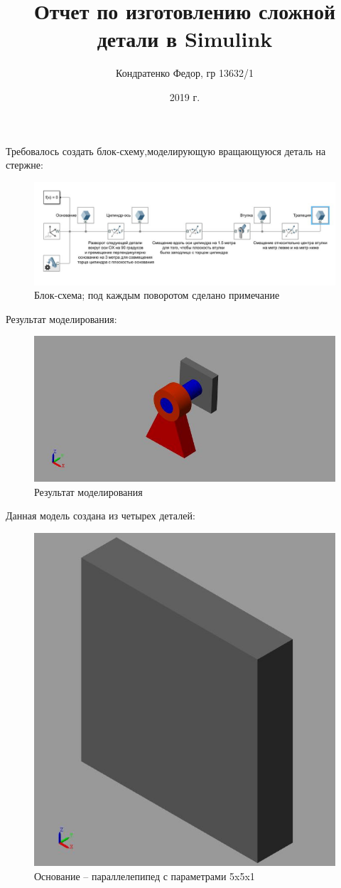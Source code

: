 \documentclass{article}
\date{2019 г.}
\author{Кондратенко Федор, гр 13632/1}
\title{Отчет по изготовлению сложной детали в Simulink}
\begin{document}
	\maketitle
	Требовалось создать блок-схему,моделирующую вращающуюся деталь на стержне:
	\begin{figure}[H]
		\centering
		\includegraphics[width=1\linewidth]{model}
		\caption{Блок-схема; под каждым поворотом сделано примечание}
		\label{fig:model}
	\end{figure}
	Результат моделирования:
	\begin{figure}[H]
		\centering
		\includegraphics[width=1\linewidth]{3d}
		\caption{Результат моделирования}
		\label{fig:3d}
	\end{figure}
	Данная модель создана из четырех деталей:
	\begin{figure}[H]
		\centering
		\includegraphics[width=0.7\linewidth]{base}
		\caption{Основание -- параллелепипед с параметрами 5x5x1}
		\label{fig:base}
	\end{figure}
\end{document}
